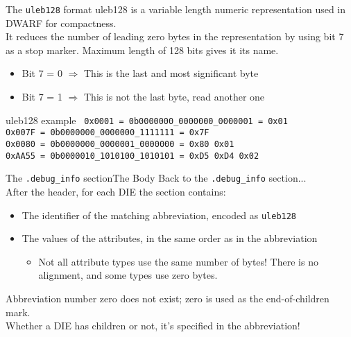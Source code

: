 \begin{frame}{The \texttt{uleb128} format}
\alert{uleb128} is a \alert{variable length numeric representation} used in DWARF
for compactness.\\
\medskip
It reduces the number of leading zero bytes in the representation by using bit 7
as a stop marker. Maximum length of 128 bits gives it its name.\\
\medskip
\begin{itemize}
\item Bit 7 = 0 $\Rightarrow$ This is the last and most significant byte
\item Bit 7 = 1 $\Rightarrow$ This is not the last byte, read another one
\end{itemize}
\medskip
\begin{block}{uleb128 example}
\tt
0x0001 = 0b0000000\_0000000\_0000001 = 0x01\\
0x007F = 0b0000000\_0000000\_1111111 = 0x7F\\
0x0080 = 0b0000000\_0000001\_0000000 = 0x80 0x01\\
0xAA55 = 0b0000010\_1010100\_1010101 = 0xD5 0xD4 0x02 \\
\end{block}
\end{frame}


\begin{frame}{The \texttt{.debug\_info} section}{The Body}
Back to the \texttt{.debug\_info} section...\\
\medskip
After the header, for each DIE the section contains:
\begin{itemize}
\item The identifier of the matching abbreviation, encoded as \texttt{uleb128}
\item The values of the attributes, in the same order as in the abbreviation
	\begin{itemize}
	\item Not all attribute types use the same number of bytes! There is no alignment,
	  and some types use \alert{zero bytes}.
	\end{itemize}
\end{itemize}
\medskip
Abbreviation number zero does not exist; zero is used as the \alert{end-of-children
mark}.\\
\smallskip
Whether a DIE has children or not, it's specified in the abbreviation!
\end{frame}



